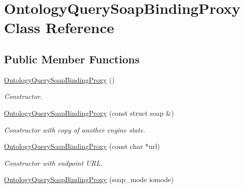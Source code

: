 \hypertarget{classOntologyQuerySoapBindingProxy}{
\section{OntologyQuerySoapBindingProxy Class Reference}
\label{classOntologyQuerySoapBindingProxy}
}
\subsection*{Public Member Functions}
\begin{DoxyCompactItemize}
\item 
\hypertarget{classOntologyQuerySoapBindingProxy_a37b041a61ef6559798cbf55c2a3b1ade}{
\hyperlink{classOntologyQuerySoapBindingProxy_a37b041a61ef6559798cbf55c2a3b1ade}{OntologyQuerySoapBindingProxy} ()}
\label{classOntologyQuerySoapBindingProxy_a37b041a61ef6559798cbf55c2a3b1ade}

\begin{DoxyCompactList}\small\item\em Constructor. \end{DoxyCompactList}\item 
\hypertarget{classOntologyQuerySoapBindingProxy_accf50d9818c8a390d47d8fde62c69b4f}{
\hyperlink{classOntologyQuerySoapBindingProxy_accf50d9818c8a390d47d8fde62c69b4f}{OntologyQuerySoapBindingProxy} (const struct soap \&)}
\label{classOntologyQuerySoapBindingProxy_accf50d9818c8a390d47d8fde62c69b4f}

\begin{DoxyCompactList}\small\item\em Constructor with copy of another engine state. \end{DoxyCompactList}\item 
\hypertarget{classOntologyQuerySoapBindingProxy_a0e6be98790a5603eb0325496463201ea}{
\hyperlink{classOntologyQuerySoapBindingProxy_a0e6be98790a5603eb0325496463201ea}{OntologyQuerySoapBindingProxy} (const char $\ast$url)}
\label{classOntologyQuerySoapBindingProxy_a0e6be98790a5603eb0325496463201ea}

\begin{DoxyCompactList}\small\item\em Constructor with endpoint URL. \end{DoxyCompactList}\item 
\hypertarget{classOntologyQuerySoapBindingProxy_a8f8a9d5b8f36a01746d7a0ada37036f6}{
\hyperlink{classOntologyQuerySoapBindingProxy_a8f8a9d5b8f36a01746d7a0ada37036f6}{OntologyQuerySoapBindingProxy} (soap\_\-mode iomode)}
\label{classOntologyQuerySoapBindingProxy_a8f8a9d5b8f36a01746d7a0ada37036f6}


\end{DoxyCompactItemize}
